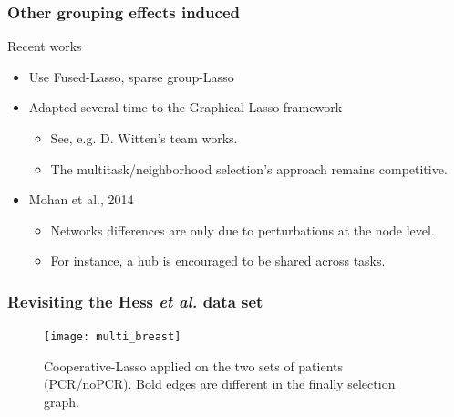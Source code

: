 \begin{frame}
  \frametitle{Other grouping effects induced}

  \begin{beamerboxesrounded}[upper=sur:head,lower=sur:bloc,shadow=true]{Recent works}
    \begin{itemize}
    \item Use Fused-Lasso, sparse group-Lasso
    \item  Adapted several  time  to the  \alert{Graphical Lasso  framework}
      \begin{itemize}
        \item\scriptsize See, e.g. D. Witten's team works.
        \item\scriptsize The multitask/neighborhood selection's approach remains competitive.
        \end{itemize}
        \vspace{.5cm}
      \item Mohan et al., 2014
        \begin{itemize}
        \item\scriptsize   Networks  differences   are  only   due  to
          \alert{perturbations at the node level}.
        \item\scriptsize For instance, a hub is encouraged to be shared across tasks.
        \end{itemize}
      \end{itemize}
    \end{beamerboxesrounded}

\end{frame}

\begin{frame}
  \frametitle{Revisiting the Hess \textit{et al.} data set}
  
  \begin{figure}
    \centering
    \texttt{[image: multi\_breast]}
    \caption{Cooperative-Lasso applied on the  two sets of patients
      (PCR/noPCR). Bold edges are different in the finally selection graph.} 
  \end{figure}

\end{frame}
